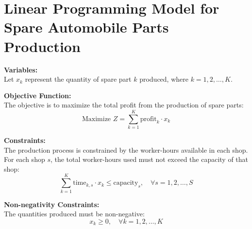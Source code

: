 \documentclass{article}
\begin{document}
\section*{Linear Programming Model for Spare Automobile Parts Production}

\textbf{Variables:} \\
Let \( x_k \) represent the quantity of spare part \( k \) produced, where \( k = 1, 2, \ldots, K \).

\textbf{Objective Function:} \\
The objective is to maximize the total profit from the production of spare parts:
\[
\text{Maximize } Z = \sum_{k=1}^{K} \text{profit}_k \cdot x_k
\]

\textbf{Constraints:} \\
The production process is constrained by the worker-hours available in each shop. For each shop \( s \), the total worker-hours used must not exceed the capacity of that shop:
\[
\sum_{k=1}^{K} \text{time}_{k,s} \cdot x_k \leq \text{capacity}_{s}, \quad \forall s = 1, 2, \ldots, S
\]

\textbf{Non-negativity Constraints:} \\
The quantities produced must be non-negative:
\[
x_k \geq 0, \quad \forall k = 1, 2, \ldots, K
\]
\end{document}
